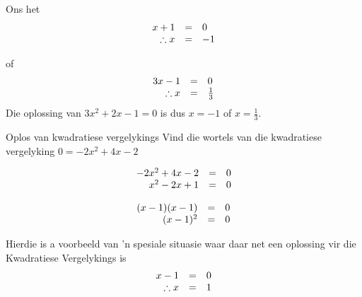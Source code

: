 \begin{aktiwiteit}{}
\begin{wex}
{
Ons het
\begin{equation*}
     \begin{array}{ccc}\hfill x+1&=&0\hfill \\
	\hfill \therefore x&=&-1
    \end{array}
\end{equation*}

of
\begin{equation*}
     \begin{array}{ccc}\hfill 3x-1&=&0\hfill \\
	\hfill \therefore x&=&\frac{1}{3}
    \end{array}
\end{equation*}
Die oplossing van $3{x}^{2}+2x-1=0$ is dus $x=-1$ of $x=\frac{1}{3}$.
}
\end{wex}


\begin{wex}{ Oplos van kwadratiese vergelykings }
{ Vind die wortels van die kwadratiese vergelyking  $0=-2{x}^{2}+4x-2$}
{

\begin{equation*}
\begin{array}{ccc}\hfill -2{x}^{2}+4x-2& =& 0\hfill \\ \hfill {x}^{2}-2x+1& =& 0\hfill \end{array}
\end{equation*}


\begin{equation*}
\begin{array}{ccc} \hfill (x-1)(x-1) &=& 0 \hfill \\
\hfill (x-1)^{2} &=&0 \hfill 
\end{array}
\end{equation*}

Hierdie is a voorbeeld van 'n spesiale situasie waar daar net een oplossing vir die Kwadratiese Vergelykings is
\begin{equation*}
\begin{array}{ccc} \hfill x -1 &=& 0 \hfill \\
\hfill \therefore x &=&1 \hfill 
\end{array}
\end{equation*}

}
\end{wex}
\end{aktiwiteit}
